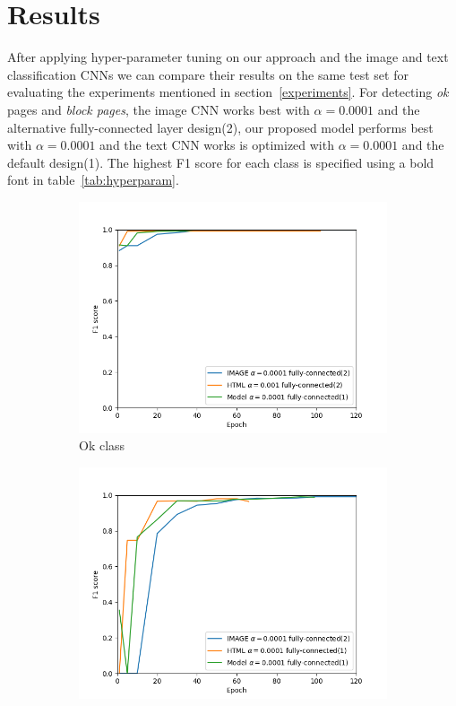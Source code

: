 \documentclass{article} %
\begin{document}
\section{Results}
After applying hyper-parameter tuning on our approach and the image and text classification CNNs we can compare their results on the same test set for evaluating the experiments mentioned in section~\ref{experiments}. For detecting \textit{ok} pages and \textit{block pages}, the image CNN works best with $\alpha=0.0001$ and the alternative fully-connected layer design(2), our proposed model performs best with  $\alpha=0.0001$ and the text CNN works is optimized with $\alpha=0.0001$ and the default design(1). The highest F1 score for each class is specified using a bold font in table~\ref{tab:hyperparam}.
\begin{figure}
        \centering
        \begin{subfigure}[b]{0.48\textwidth}
            \centering
            \includegraphics[width=\textwidth]{okF1.png}
            \caption[]%
            {{\small Ok class}}    
            \label{fig:okF1}
        \end{subfigure}
        \hfill
        \begin{subfigure}[b]{0.48\textwidth}  
            \centering 
            \includegraphics[width=\textwidth]{blockF1.png}

\end{subfigure}
\end{figure}
\end{document}
